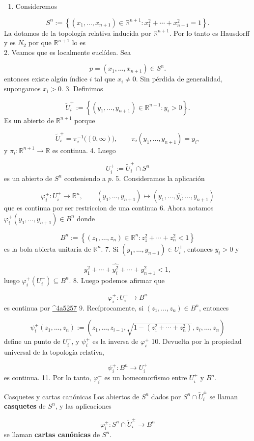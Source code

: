 \begin{bookproof}{}
\begin{enumerate}
\item Consideremos
\end{enumerate}
\[
S^n:=\left\{(x_1,\dots,x_{n+1})\in \mathbb{R}^{n+1}:x_1^2+\cdots+x_{n+1}^2=1\right\}.
\]
La dotamos de la topología relativa inducida por $\mathbb{R}^{n+1}$. Por lo tanto es Hausdorff y es $N_{2}$ por que $\mathbb{R}^{n+1}$ lo es\\
2. Veamos que es localmente euclídea. Sea

\[
p=(x_1,\dots,x_{n+1})\in S^n.
\]
entonces existe algún índice $i$ tal que $x_i\neq 0$. Sin pérdida de generalidad, supongamos $x_i>0$. 3. Definimos

\[
\widetilde U_i^+:=\left\{(y_1,\dots,y_{n+1})\in \mathbb{R}^{n+1}:y_i>0\right\}.
\]
Es un abierto de $\mathbb{R}^{n+1}$ porque

\[
\widetilde U_i^+=\pi_i^{-1}\bigl((0,\infty)\bigr),\qquad \pi_i(y_1,\dots,y_{n+1})=y_i,
\]
y $\pi_{i}:\mathbb{R}^{n+1}\to\mathbb{R}$ es continua. 4. Luego

\[
U_i^+:=\widetilde U_i^+\cap S^n
\]
es un abierto de $S^n$ conteniendo a $p$. 5. Consideramos la aplicación

\[
\varphi_i^+:U_i^+\longrightarrow \mathbb{R}^n,\qquad (y_1,\dots,y_{n+1})\longmapsto (y_1,\dots,\widehat{y_i},\dots,y_{n+1})
\]
que es continua por ser restriccion de una continua 6. Ahora notamos $\varphi_{i}^{+}(y_{1},\ldots,y_{n+1})\in B^{n}$ donde

\[
B^n:=\left\{(z_1,\dots,z_n)\in \mathbb{R}^n:z_1^2+\cdots+z_n^2<1\right\}
\]
es la bola abierta unitaria de $\mathbb{R}^n$. 7. Si $(y_1,\dots,y_{n+1})\in U_i^+$, entonces $y_i>0$ y

\[
y_1^2+\cdots+\widehat{y_i^2}+\cdots+y_{n+1}^2<1,
\]
luego $\varphi_i^+(U_i^+)\subseteq B^n$. 8. Luego podemos afirmar que

\[
\varphi_{i}^{+}:U_{i}^{+}\rightarrow B^{n}
\]
es continua por \hyperref[blk:4a5257]{\textasciicircum{}4a5257} 9. Recíprocamente, si $(z_1,\dots,z_n)\in B^n$, entonces

\[
\psi_i^+(z_1,\dots,z_n):=\left(z_1,\dots,z_{i-1},\sqrt{1-(z_1^2+\cdots+z_n^2)},z_i,\dots,z_n\right)
\]
define un punto de $U_i^+$, y $\psi_i^+$ es la inversa de $\varphi_i^+$ 10. Devuelta por la propiedad universal de la topología relativa,

\[
\psi_i^+:B^{n}\rightarrow U_{i}^{+}
\]
es continua. 11. Por lo tanto, $\varphi_i^+$ es un homeomorfismo entre $U_i^+$ y $B^n$.

\bookqed
\end{bookproof}
\begin{bookdefinition}{Casquetes y cartas canónicas}
Los abiertos de $S^n$ dados por $S^n\cap \widetilde U_i^\pm$ se llaman \textbf{casquetes} de $S^n$, y las aplicaciones

\[
\varphi_i^\pm:S^n\cap \widetilde U_i^\pm\longrightarrow B^n
\]
se llaman \textbf{cartas canónicas} de $S^n$.

\end{bookdefinition}
